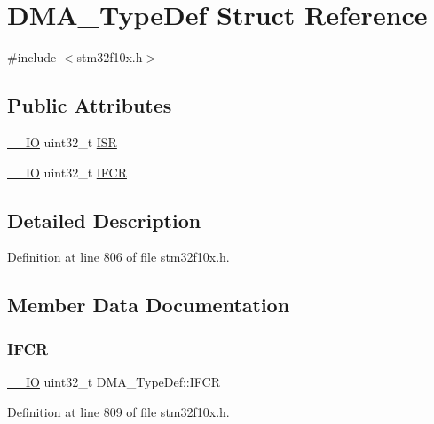 \hypertarget{struct_d_m_a___type_def}{}\section{D\+M\+A\+\_\+\+Type\+Def Struct Reference}
\label{struct_d_m_a___type_def}


{\ttfamily \#include $<$stm32f10x.\+h$>$}

\subsection*{Public Attributes}
\begin{DoxyCompactItemize}
\item 
\hyperlink{core__sc300_8h_aec43007d9998a0a0e01faede4133d6be}{\+\_\+\+\_\+\+IO} uint32\+\_\+t \hyperlink{struct_d_m_a___type_def_aa341a859df2f59bf6c0f7a000ab8734b}{I\+SR}
\item 
\hyperlink{core__sc300_8h_aec43007d9998a0a0e01faede4133d6be}{\+\_\+\+\_\+\+IO} uint32\+\_\+t \hyperlink{struct_d_m_a___type_def_a30576220ca1968e61666d92092e8911e}{I\+F\+CR}
\end{DoxyCompactItemize}


\subsection{Detailed Description}


Definition at line 806 of file stm32f10x.\+h.



\subsection{Member Data Documentation}
\mbox{\label{struct_d_m_a___type_def_a30576220ca1968e61666d92092e8911e}} 
\subsubsection{\texorpdfstring{I\+F\+CR}{IFCR}}
{\footnotesize\ttfamily \hyperlink{core__sc300_8h_aec43007d9998a0a0e01faede4133d6be}{\+\_\+\+\_\+\+IO} uint32\+\_\+t D\+M\+A\+\_\+\+Type\+Def\+::\+I\+F\+CR}



Definition at line 809 of file stm32f10x.\+h.

